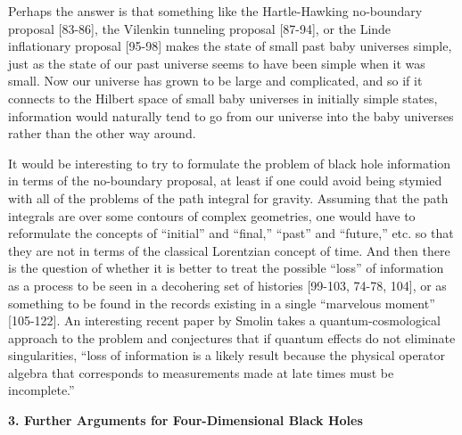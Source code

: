 \documentclass[12pt]{article}
\begin{document}
     Perhaps the answer is that something like
the Hartle-Hawking no-boundary proposal
[83-86],
the Vilenkin tunneling proposal
[87-94],
or the Linde inflationary proposal
[95-98]
makes the state of small past baby universes
simple, just as the state of our past universe seems to have been
simple when
it was small.  Now our universe has grown to be large and
complicated, and so
if it connects to the Hilbert space of small baby universes in
initially simple
states, information would naturally tend to go from our universe into
the baby
universes rather than the other way around.

     It would be interesting to try to formulate the problem of black
hole
information in terms of the no-boundary proposal, at least if one
could avoid
being stymied with all of the problems of the path integral for
gravity.
Assuming that the path integrals are over some contours of complex
geometries,
one would have to reformulate the concepts of ``initial'' and
``final,''
``past''
and ``future,'' etc. so that they are not in terms of the classical
Lorentzian
concept of time.  And then there is the question of whether it is
better to
treat the possible ``loss'' of information as a process to be seen in
a
decohering set of histories
[99-103, 74-78, 104],
or as something to be found in the records
existing in a single ``marvelous moment''
[105-122].
An interesting recent paper
by Smolin \cite{Smo} takes a quantum-cosmological approach to the
problem and
conjectures that if quantum effects do not eliminate singularities,
``loss of
information is a likely result because the physical operator algebra
that
corresponds to measurements made at late times must be incomplete.''

\vspace{5 mm}
{\bf 3.  Further Arguments for Four-Dimensional Black Holes}
\vspace{5 mm}
\end{document}
